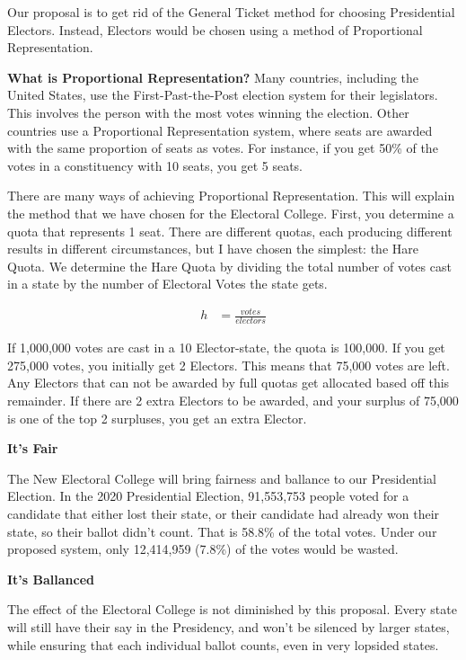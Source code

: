 \documentclass{article}
\begin{document}
    Our proposal is to get rid of the General Ticket method for choosing Presidential Electors. Instead, Electors would be chosen using a method of 
    Proportional Representation.

    \textbf{What is Proportional Representation?}
    Many countries, including the United States, use the First-Past-the-Post election system for their legislators. This involves the person with the 
    most votes winning the election. Other countries use a Proportional Representation system, where seats are awarded with the same proportion of seats 
    as votes. For instance, if you get 50\% of the votes in a constituency with 10 seats, you get 5 seats.

    There are many ways of achieving Proportional Representation. This will explain the method that we have chosen for the Electoral College. First, you 
    determine a quota that represents 1 seat. There are different quotas, each producing different results in different circumstances, but I have chosen 
    the simplest: the Hare Quota. We determine the Hare Quota by dividing the total number of votes cast in a state by the number of Electoral Votes the
    state gets.

    \begin{align}
        h &= \frac{votes}{electors}
    \end{align}

    If 1,000,000 votes are cast in a 10 Elector-state, the quota is 100,000. If you get 275,000 votes, you initially get 2 Electors. This means that 
    75,000 votes are left. Any Electors that can not be awarded by full quotas get allocated based off this remainder. If there are 2 extra Electors to 
    be awarded, and your surplus of 75,000 is one of the top 2 surpluses, you get an extra Elector.

    \textbf{It's Fair}

    The New Electoral College will bring fairness and ballance to our Presidential Election. In the 2020 Presidential Election, 91,553,753 people voted 
    for a candidate that either lost their state, or their candidate had already won their state, so their ballot didn't count. That is 58.8\% of the 
    total votes. Under our proposed system, only 12,414,959 (7.8\%) of the votes would be wasted.

    \textbf{It's Ballanced}

    The effect of the Electoral College is not diminished by this proposal. Every state will still have their say in the Presidency, and won't be 
    silenced by larger states, while ensuring that each individual ballot counts, even in very lopsided states.
\end{document}
